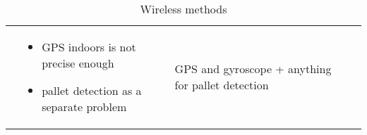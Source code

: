 \documentclass[../report.tex]{subfiles}
\begin{document}
\begin{table}[ht]
\begin{tabularx}{\linewidth}{c|L|L|L|c}
\begin{itemize}
            \end{itemize} & \begin{itemize}
                \item GPS indoors is not precise enough
                \item pallet detection as a separate problem
            \end{itemize} 
            & GPS and gyroscope + anything for pallet detection
            \\            
        \end{tabularx}
    \caption{Wireless methods}
    \label{tab:my_label}
    \end{table}
    
\end{document}
